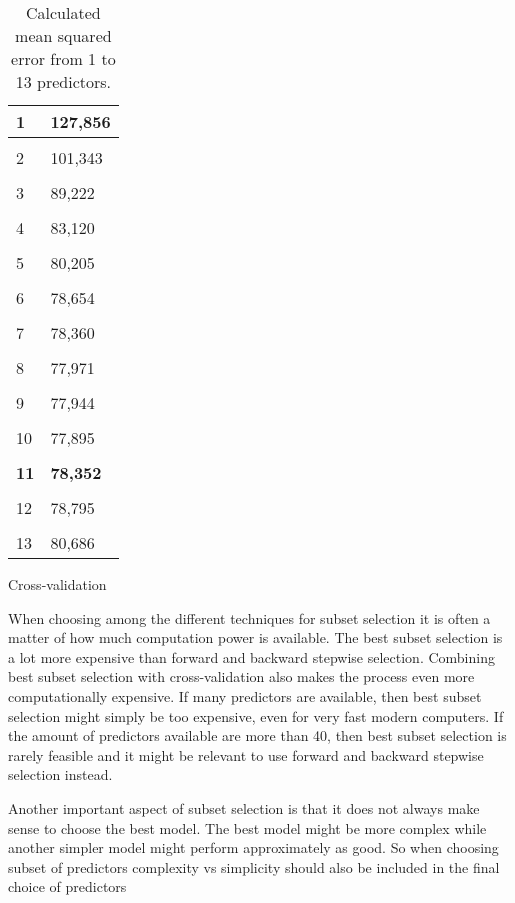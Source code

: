 \begin{table}
\begin{subtable}[t]{2in}
\begin{tabular}{ p{2.5cm} p{1.5cm}  }
		1 & 127,856 \\\hline
		\\
		2 & 101,343 \\\hline
		\\
		3 & 89,222  \\\hline
		\\
		4 & 83,120  \\\hline
		\\
		5 & 80,205  \\\hline
		\\
		6 & 78,654  \\\hline
		\\
		7 & 78,360  \\\hline
		\\
		8 & 77,971  \\\hline
		\\
		9 & 77,944  \\\hline
		\\
		10 & 77,895 \\\hline
		\\
		\textbf{11} & \textbf{78,352}  \\\hline
		\\
		12 & 78,795 \\\hline
		\\
		13 & 80,686 \\\hline
	\end{tabular}
		\caption{Cross-validation}\label{table:mse_cross}
	\end{subtable}
	\caption{Calculated mean squared error from 1 to 13 predictors.}\label{table:mse}
\end{table}

When choosing among the different techniques for subset selection it is often a matter of how much computation power is available.  The best subset selection is a lot more expensive than forward and backward stepwise selection. Combining best subset selection with cross-validation also makes the process even more computationally expensive. If many predictors are available, then best subset selection might simply be too expensive, even for very fast modern computers. If the amount of predictors available are more than 40, then best subset selection is rarely feasible and it might be relevant to use forward and backward stepwise selection instead.

Another important aspect of subset selection is that it does not always make sense to choose the best model. The best model might be more complex while another simpler model might perform approximately as good. So when choosing subset of predictors complexity vs simplicity should also be included in the final choice of predictors